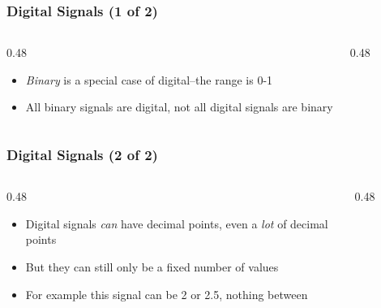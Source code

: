 \begin{frame}
    \frametitle{Digital Signals (1 of 2)}

    \begin{columns}
        \begin{column}{0.48\linewidth}
            \begin{itemize}
                \item \emph{Binary} is a special case of digital--the range is 0-1
                \item All binary signals are digital, not all digital signals are binary
            \end{itemize}
        \end{column}
        \begin{column}{0.48\linewidth}
            \begin{figure}
                \centering
                \resizebox{0.75\linewidth}{!}{
                    
                }
            \end{figure}
        \end{column}        
    \end{columns}    
\end{frame}

\begin{frame}
    \frametitle{Digital Signals (2 of 2)}

    \begin{columns}
        \begin{column}{0.48\linewidth}
            \begin{itemize}
                \item Digital signals \emph{can} have decimal points, even a \emph{lot} of decimal points
                \item But they can still only be a fixed number of values
                \item For example this signal can be 2 or 2.5, nothing between
            \end{itemize}
        \end{column}
        \begin{column}{0.48\linewidth}
            \begin{figure}
                \centering
                \resizebox{0.75\linewidth}{!}{
                    
                }
            \end{figure}
        \end{column}        
    \end{columns}    
\end{frame}

